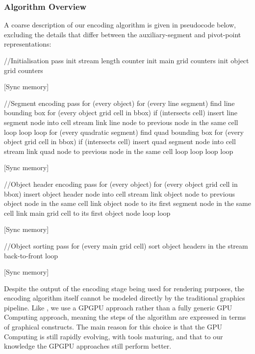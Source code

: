\documentclass[11pt,a4paper,twoside]{article}
\newenvironment {code}{\footnotesize}{\normalsize}
\begin{document}
\subsubsection {Algorithm Overview}

A coarse description of our encoding algorithm is given in pseudocode below, excluding the details that differ between the auxiliary-segment and pivot-point representations:

\begin {code}
\begin {verbatimtab}[3]

//Initialisation pass
init stream length counter
init main grid counters
init object grid counters

[Sync memory]

//Segment encoding pass
for (every object)
	for (every line segment)
		find line bounding box
		for (every object grid cell in bbox)
			if (intersects cell)
				insert line segment node into cell stream
				link line node to previous node in the same cell
			loop
		loop
	loop
	for (every quadratic segment)
		find quad bounding box
		for (every object grid cell in bbox)
			if (intersects cell)
				insert quad segment node into cell stream
				link quad node to previous node in the same cell
			loop
		loop
	loop
loop

[Sync memory]

//Object header encoding pass
for (every object)
	for (every object grid cell in bbox)
		insert object header node into cell stream
		link object node to previous object node in the same cell
		link object node to its first segment node in the same cell
		link main grid cell to its first object node
	loop
loop

[Sync memory]

//Object sorting pass
for (every main grid cell)
	sort object headers in the stream back-to-front 
loop

[Sync memory]
\end {verbatimtab}
\end {code}

Despite the output of the encoding stage being used for rendering purposes, the encoding algorithm itself cannot be modeled directly by the traditional graphics pipeline. Like \cite{NehabHoppe08}, we use a GPGPU approach rather than a fully generic GPU Computing approach, meaning the steps of the algorithm are expressed in terms of graphical constructs. The main reason for this choice is that the GPU Computing is still rapidly evolving, with tools maturing, and that to our knowledge the GPGPU approaches still perform better.
\end{document}
